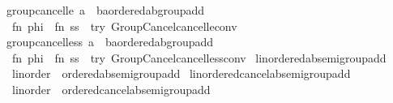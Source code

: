 \begin{isabellebody}
\ group{\isacharunderscore}{\kern0pt}cancel{\isacharunderscore}{\kern0pt}le\ {\isacharparenleft}{\kern0pt}{\isachardoublequoteopen}a\ {\isasymle}\ {\isacharparenleft}{\kern0pt}b{\isacharcolon}{\kern0pt}{\isacharcolon}{\kern0pt}{\isacharprime}{\kern0pt}a{\isacharcolon}{\kern0pt}{\isacharcolon}{\kern0pt}ordered{\isacharunderscore}{\kern0pt}ab{\isacharunderscore}{\kern0pt}group{\isacharunderscore}{\kern0pt}add{\isacharparenright}{\kern0pt}{\isachardoublequoteclose}{\isacharparenright}{\kern0pt}\ {\isacharequal}{\kern0pt}\isanewline
\ \ {\isacartoucheopen}fn\ phi\ {\isacharequal}{\kern0pt}{\isachargreater}{\kern0pt}\ fn\ ss\ {\isacharequal}{\kern0pt}{\isachargreater}{\kern0pt}\ try\ Group{\isacharunderscore}{\kern0pt}Cancel{\isachardot}{\kern0pt}cancel{\isacharunderscore}{\kern0pt}le{\isacharunderscore}{\kern0pt}conv{\isacartoucheclose}\isanewline
\isanewline
{}\isamarkupfalse%
\ group{\isacharunderscore}{\kern0pt}cancel{\isacharunderscore}{\kern0pt}less\ {\isacharparenleft}{\kern0pt}{\isachardoublequoteopen}a\ {\isacharless}{\kern0pt}\ {\isacharparenleft}{\kern0pt}b{\isacharcolon}{\kern0pt}{\isacharcolon}{\kern0pt}{\isacharprime}{\kern0pt}a{\isacharcolon}{\kern0pt}{\isacharcolon}{\kern0pt}ordered{\isacharunderscore}{\kern0pt}ab{\isacharunderscore}{\kern0pt}group{\isacharunderscore}{\kern0pt}add{\isacharparenright}{\kern0pt}{\isachardoublequoteclose}{\isacharparenright}{\kern0pt}\ {\isacharequal}{\kern0pt}\isanewline
\ \ {\isacartoucheopen}fn\ phi\ {\isacharequal}{\kern0pt}{\isachargreater}{\kern0pt}\ fn\ ss\ {\isacharequal}{\kern0pt}{\isachargreater}{\kern0pt}\ try\ Group{\isacharunderscore}{\kern0pt}Cancel{\isachardot}{\kern0pt}cancel{\isacharunderscore}{\kern0pt}less{\isacharunderscore}{\kern0pt}conv{\isacartoucheclose}%
\endisatagML
{\isafoldML}%
%
\isadelimML
\isanewline
%
\endisadelimML
\isanewline
{}\isamarkupfalse%
\ linordered{\isacharunderscore}{\kern0pt}ab{\isacharunderscore}{\kern0pt}semigroup{\isacharunderscore}{\kern0pt}add\ {\isacharequal}{\kern0pt}\isanewline
\ \ linorder\ {\isacharplus}{\kern0pt}\ ordered{\isacharunderscore}{\kern0pt}ab{\isacharunderscore}{\kern0pt}semigroup{\isacharunderscore}{\kern0pt}add\isanewline
\isanewline
{}\isamarkupfalse%
\ linordered{\isacharunderscore}{\kern0pt}cancel{\isacharunderscore}{\kern0pt}ab{\isacharunderscore}{\kern0pt}semigroup{\isacharunderscore}{\kern0pt}add\ {\isacharequal}{\kern0pt}\isanewline
\ \ linorder\ {\isacharplus}{\kern0pt}\ ordered{\isacharunderscore}{\kern0pt}cancel{\isacharunderscore}{\kern0pt}ab{\isacharunderscore}{\kern0pt}semigroup{\isacharunderscore}{\kern0pt}add\isanewline

\end{isabellebody}
